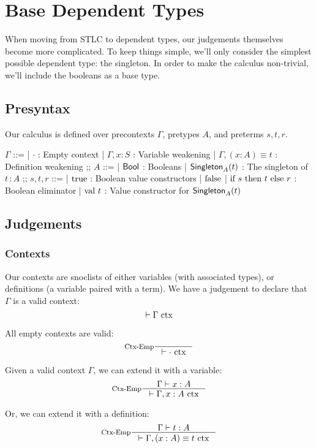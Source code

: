 \section{Base Dependent Types}
When moving from STLC to dependent types, our judgements themselves become more complicated.
To keep things simple, we'll only consider the simplest possible dependent type: the singleton.
In order to make the calculus non-trivial, we'll include the booleans as a base type.

\subsection{Presyntax}
Our calculus is defined over precontexts $\Gamma$, pretypes $A$, and preterms $s, t, r$.

\begin{bnf}
$\Gamma$ ::=
  | $\cdot$ : Empty context
  | $\Gamma, x \colon S$ : Variable weakening
  | $\Gamma, (x : A) \equiv t$ : Definition weakening
;;
$A$ ::=
  | $\textsf{Bool}$ : Booleans
  | $\textsf{Singleton}_{A}(t)$ : The singleton of $t \,\colon A$
;;
$s, t, r$ ::=
| $\textrm{true}$ : Boolean value constructors
| $\textrm{false}$
| $\textrm{if } s \textrm{ then } t \textrm{ else } r$ : Boolean eliminator
| $\textrm{val } t$ : Value constructor for $\textsf{Singleton}_{A}(t)$
\end{bnf}


\subsection{Judgements}
\subsubsection{Contexts}
Our contexts are snoclists of either variables (with associated types), or definitions (a variable paired with a term).
We have a judgement to declare that $\Gamma$ is a valid context:
\[
  \vdash \Gamma \textrm{ ctx}
\]

All empty contexts are valid:
\[
  \inference[Ctx-Emp]{}{\vdash \ctx{\cdot}}
\]

Given a valid context $\Gamma$, we can extend it with a variable:
\[
  \inference[Ctx-Emp]
  {\Gamma \vdash x : A}
  {\vdash \ctx{\Gamma, x : A}}
\]

Or, we can extend it with a definition:
\[
  \inference[Ctx-Emp]
  {\Gamma \vdash t : A}
  {\vdash \ctx{\Gamma, (x : A) \equiv t}}
\]


